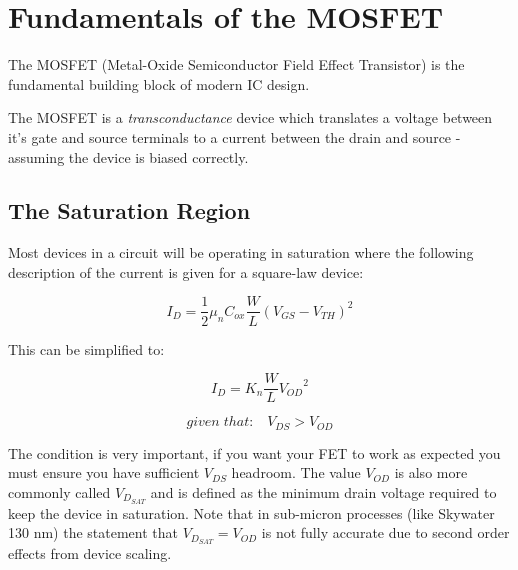 \documentclass[11pt]{article}
\begin{document}

\maketitle %

\thispagestyle{empty} %

\newpage


\section{Fundamentals of the MOSFET}

The MOSFET (Metal-Oxide Semiconductor Field Effect Transistor) is the fundamental building block of modern IC design.

\begin{figure}[h]
\end{figure}

The MOSFET is a \textit{transconductance} device which translates a voltage between it's gate and source terminals to a current between the drain and source - assuming the device is biased correctly.

\subsection{The Saturation Region}

Most devices in a circuit will be operating in saturation where the following description of the current is given for a square-law device:

\begin{equation}
I_D = \frac{1}{2} \mu_n C_{ox} \frac{W}{L} {\left( V_{GS} - V_{TH} \right)}^2
\end{equation}

This can be simplified to:

\begin{equation}
I_D = K_n \frac{W}{L} {V_{OD}}^2
\end{equation}

\begin{equation}
given \; that: \;\;\; V_{DS} > V_{OD}
\end{equation}

The condition is very important, if you want your FET to work as expected you must ensure you have sufficient $V_{DS}$ headroom.  The value $V_{OD}$ is also more commonly called $V_{D_{SAT}}$ and is defined as the minimum drain voltage required to keep the device in saturation. Note that in sub-micron processes (like Skywater 130 nm) the statement that $V_{D_{SAT}} = V_{OD}$ is not fully accurate due to second order effects from device scaling.
\end{document}
